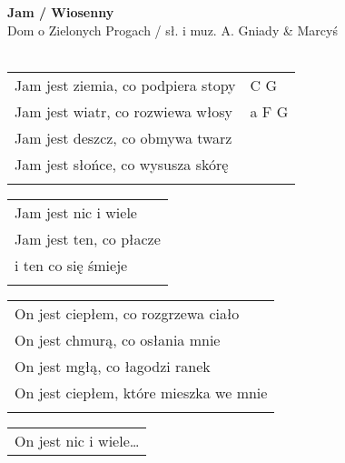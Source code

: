 \documentclass[a5paper]{article}
\begin{document}


\noindent
\fontsize{12pt}{15pt}\selectfont
\textbf{Jam / Wiosenny} \\
\fontsize{8pt}{10pt}\selectfont
Dom o Zielonych Progach / sł. i muz. A. Gniady \& Marcyś \\ \\
\fontsize{10pt}{12pt}\selectfont
{}
\begin{tabular}{@{}p{6.50cm}p{3cm}@{}}
\noindent
Jam jest ziemia, co podpiera stopy & C G \\
Jam jest wiatr, co rozwiewa włosy & a F G \\
Jam jest deszcz, co obmywa twarz & \\
Jam jest słońce, co wysusza skórę & \\ \\
\end{tabular}

\noindent
\begin{tabular}{@{}p{6.50cm}@{}}
Jam jest nic i wiele \\
Jam jest ten, co płacze \\
i ten co się śmieje \\ \\
\end{tabular}

\noindent
\begin{tabular}{@{}p{7.50cm}@{}}
On jest ciepłem, co rozgrzewa ciało \\
On jest chmurą, co osłania mnie \\
On jest mgłą, co łagodzi ranek \\
On jest ciepłem, które mieszka we mnie \\ \\
\end{tabular}

\noindent
\begin{tabular}{@{}p{6.50cm}@{}}
On jest nic i wiele…
\end{tabular}
\end{document}
